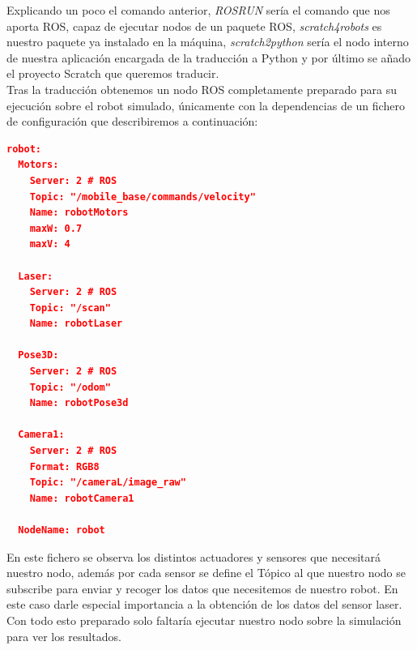 Explicando un poco el comando anterior, \textit{ROSRUN} sería el comando que nos aporta ROS, capaz de ejecutar nodos de un paquete ROS, \textit{scratch4robots} es nuestro paquete ya instalado en la máquina, \textit{scratch2python} sería el nodo interno de nuestra aplicación encargada de la traducción a Python y por último se añado el proyecto Scratch que queremos traducir.\\

Tras la traducción obtenemos un nodo ROS completamente preparado para su ejecución sobre el robot simulado, únicamente con la dependencias de un fichero de configuración que describiremos a continuación:\\

\begin{lstlisting}[language=json,firstnumber=1]
robot:
  Motors:
    Server: 2 # ROS
    Topic: "/mobile_base/commands/velocity"
    Name: robotMotors
    maxW: 0.7
    maxV: 4

  Laser:
    Server: 2 # ROS
    Topic: "/scan"
    Name: robotLaser

  Pose3D:
    Server: 2 # ROS
    Topic: "/odom"
    Name: robotPose3d

  Camera1:
    Server: 2 # ROS
    Format: RGB8
    Topic: "/cameraL/image_raw"
    Name: robotCamera1

  NodeName: robot
\end{lstlisting}

En este fichero se observa los distintos actuadores y sensores que necesitará nuestro nodo, además por cada sensor se define el Tópico al que nuestro nodo se subscribe para enviar y recoger los datos que necesitemos de nuestro robot. En este caso darle especial importancia a la obtención de los datos del sensor laser.\\

Con todo esto preparado solo faltaría ejecutar nuestro nodo sobre la simulación para ver los resultados.\\

